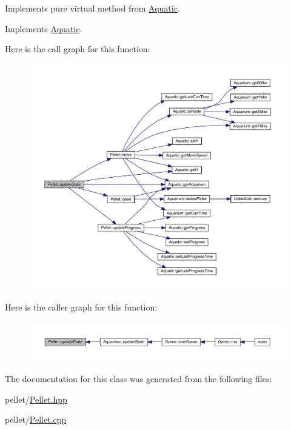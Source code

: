 Implements pure virtual method from \mbox{\hyperlink{class_aquatic}{Aquatic}}. 



Implements \mbox{\hyperlink{class_aquatic_a51e44c95476d72a841fea667c6cbbedc}{Aquatic}}.

Here is the call graph for this function\+:\nopagebreak
\begin{figure}[H]
\begin{center}
\leavevmode
\includegraphics[width=350pt]{class_pellet_ab21f88899eba022e1693d911eba9dbfb_cgraph}
\end{center}
\end{figure}
Here is the caller graph for this function\+:\nopagebreak
\begin{figure}[H]
\begin{center}
\leavevmode
\includegraphics[width=350pt]{class_pellet_ab21f88899eba022e1693d911eba9dbfb_icgraph}
\end{center}
\end{figure}


The documentation for this class was generated from the following files\+:\begin{DoxyCompactItemize}
\item 
pellet/\mbox{\hyperlink{_pellet_8hpp}{Pellet.\+hpp}}\item 
pellet/\mbox{\hyperlink{_pellet_8cpp}{Pellet.\+cpp}}\end{DoxyCompactItemize}

